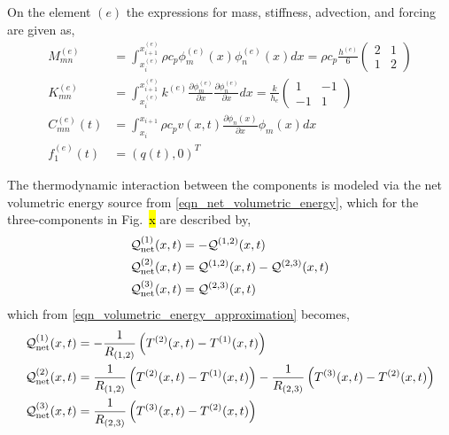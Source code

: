 On the element $(e)$ the expressions for mass, stiffness, advection, and forcing are given as,
\begin{align}
    M^{(e)}_{mn} &= \int_{x^{(e)}_i}^{x^{(e)}_{i+1}}\rho c_p\phi^{(e)}_m(x)\phi^{(e)}_n(x)dx = \rho c_p \frac{h^{(e)}}{6}\begin{pmatrix}
        2 & 1 \\ 1 & 2
    \end{pmatrix}\\
    K^{(e)}_{mn} &= \int_{x^{(e)}_i}^{x^{(e)}_{i+1}} k^{(e)} \frac{\partial \phi^{(e)}_m}{\partial x}\frac{\partial \phi^{(e)}_n}{\partial x} dx = \frac{k}{h_e}\begin{pmatrix}
        1 & -1 \\ -1 & 1
    \end{pmatrix}\\
    C^{(e)}_{mn}(t) &= \int_{x_i}^{x_{i+1}}\rho c_p v(x,t) \frac{\partial \phi_n(x)}{\partial x}\phi_m(x) dx\\
    f^{(e)}_1(t) &= \left(q(t),0\right)^T
\end{align}



The thermodynamic interaction between the components is modeled via the net volumetric energy source from \cref{eqn_net_volumetric_energy}, which for the three-components in Fig.~\hl{x} are described by,
\begin{subequations}
    \begin{align}
        \mathcal{Q}^{(1)}_{\text{net}}(x,t) &= -\mathcal{Q}^{(1,2)}(x,t)\\
        \mathcal{Q}^{(2)}_{\text{net}}(x,t) &= \mathcal{Q}^{(1,2)}(x,t) - \mathcal{Q}^{(2,3)}(x,t)\\
        \mathcal{Q}^{(3)}_{\text{net}}(x,t) &= \mathcal{Q}^{(2,3)}(x,t)
    \end{align}
\end{subequations}
which from \cref{eqn_volumetric_energy_approximation} becomes,
\begin{subequations}
    \begin{align*}
        \mathcal{Q}^{(1)}_{\text{net}}(x,t) &= -\frac{1}{R_{(1,2)}}\left(T^{(2)}(x,t) - T^{(1)}(x,t)\right)\\
        \mathcal{Q}^{(2)}_{\text{net}}(x,t) &= \frac{1}{R_{(1,2)}}\left(T^{(2)}(x,t) - T^{(1)}(x,t)\right) - \frac{1}{R_{(2,3)}}\left(T^{(3)}(x,t) - T^{(2)}(x,t)\right)\\
        \mathcal{Q}^{(3)}_{\text{net}}(x,t) &= \frac{1}{R_{(2,3)}}\left(T^{(3)}(x,t) - T^{(2)}(x,t)\right)
    \end{align*}
\end{subequations}

